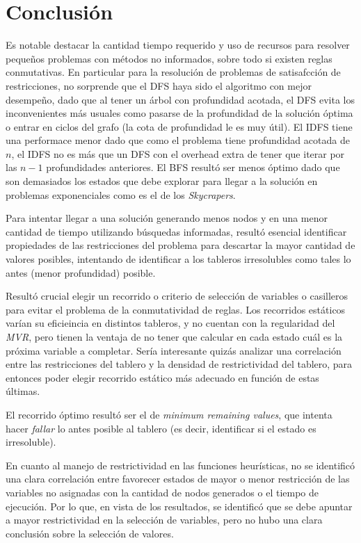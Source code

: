 \documentclass[%
    final,
    reprint,
    notitlepage,
    narroweqnarray,
    inline,
    twoside,
    invited
    ]{ieee}
\begin{document}
\section{Conclusión}

\PARstart Es notable destacar la cantidad tiempo requerido y uso de recursos para resolver pequeños problemas con métodos no informados, sobre todo si existen reglas conmutativas. 
 En particular para la resolución de problemas de satisafcción de restricciones, no sorprende que el DFS haya sido el algoritmo con mejor desempeño, dado que al tener un árbol con profundidad acotada, el DFS evita los inconvenientes más usuales como pasarse de la profundidad de la solución óptima o entrar en ciclos del grafo (la cota de profundidad le es muy útil). El IDFS tiene una performace menor dado que como el problema tiene profundidad acotada de $n$, el IDFS no es más que un DFS con el overhead extra de tener que iterar por las $n-1$ profundidades anteriores. El BFS resultó ser menos óptimo dado que son demasiados los estados que debe explorar para llegar a la solución en problemas exponenciales como es el de los \textit{Skycrapers}. 
\par Para intentar llegar a una solución generando menos nodos y en una menor cantidad de tiempo utilizando búsquedas informadas, resultó esencial identificar 
propiedades de las restricciones del problema para descartar la mayor cantidad de valores posibles, intentando de identificar a los tableros irresolubles como tales 
lo antes (menor profundidad) posible.
\par Resultó crucial elegir un recorrido o criterio de selección de variables o casilleros para evitar el problema de la conmutatividad de reglas. Los 
recorridos estáticos varían su eficieincia en distintos tableros, y no cuentan con la regularidad del \textit{MVR}, pero tienen la ventaja de no 
tener que calcular en cada estado cuál es la próxima variable a completar. Sería interesante quizás analizar una correlación entre las restricciones 
del tablero y la densidad de restrictividad del tablero, para entonces poder elegir recorrido estático más adecuado en función de estas últimas.
\par El recorrido óptimo resultó ser el de \textit{minimum remaining values}, que intenta hacer \textit{fallar} lo antes posible al tablero (es decir, 
identificar si el estado es irresoluble).
\par En cuanto al manejo de restrictividad en las funciones heurísticas, no se identificó una clara correlación entre 
favorecer estados de mayor o menor restricción de las variables no asignadas con la cantidad de nodos generados o el tiempo de ejecución. 
Por lo que, en vista de los resultados, se identificó que se debe apuntar a mayor restrictividad 
en la selección de variables, pero no hubo una clara conclusión sobre la selección de valores.
\end{document}

